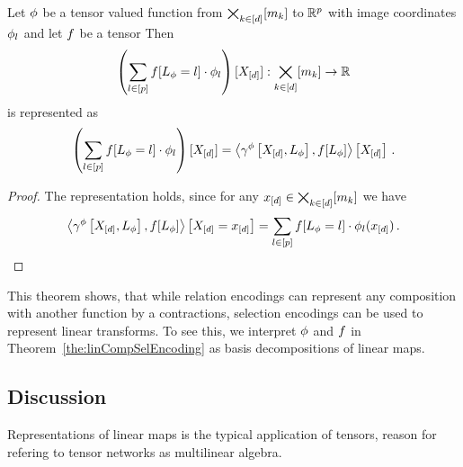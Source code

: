 \begin{theorem}\label{the:linCompSelEncoding}
	Let $\phi$ be a tensor valued function from $\bigtimes_{k\in[d]}[m_{k}]$ to $\mathbb{R}^{p}$ with image coordinates $\phi_l$ and let $f$ be a tensor 
	Then
		\[ \left(\sum_{l\in[p]}f[L_{\phi}=l]\cdot \phi_l \right) [X_{[d]}] : \bigtimes_{k\in[d]}[m_{k}] \rightarrow \mathbb{R} \]
	is represented as
		\[ \left(\sum_{l\in[p]}f[L_{\phi}=l]\cdot \phi_l \right) [X_{[d]}] 
		 = \left\langle \gamma^{\phi}\left[X_{[d]},L_{\phi}\right] , f[L_{\phi}]\right\rangle \left[ X_{[d]} \right] \, . \]
\end{theorem}
\begin{proof}
	The representation holds, since for any $x_{[d]}\in\bigtimes_{k\in[d]}[m_{k}]$ we have
	\begin{align*}
		\left\langle \gamma^{\phi}\left[X_{[d]},L_{\phi}\right] , f[L_{\phi}]\right\rangle \left[ X_{[d]}=x_{[d]} \right]  
		= \sum_{l\in[p]}f[L_{\phi}=l]\cdot\phi_l(x_{[d]}) \, . 
	\end{align*} 
\end{proof}

This theorem shows, that while relation encodings can represent any composition with another function by a contractions, selection encodings can be used to represent linear transforms.
To see this, we interpret $\phi$ and $f$ in Theorem~\ref{the:linCompSelEncoding} as basis decompositions of linear maps.


\subsection{Discussion}

Representations of linear maps is the typical application of tensors, reason for refering to tensor networks as multilinear algebra.

